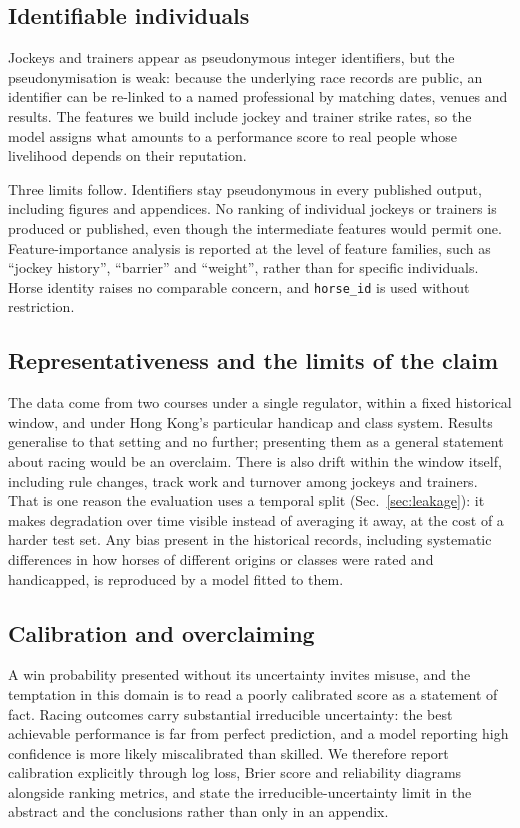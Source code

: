 \subsection{Identifiable individuals}

Jockeys and trainers appear as pseudonymous integer identifiers, but the
pseudonymisation is weak: because the underlying race records are public,
an identifier can be re-linked to a named professional by matching dates,
venues and results. The features we build include jockey and trainer strike
rates, so the model assigns what amounts to a performance score to real
people whose livelihood depends on their reputation.

Three limits follow. Identifiers stay pseudonymous in every published
output, including figures and appendices. No ranking of individual jockeys
or trainers is produced or published, even though the intermediate
features would permit one. Feature-importance analysis is reported at the
level of feature families, such as ``jockey history'', ``barrier'' and
``weight'', rather than for specific individuals. Horse identity raises no
comparable concern, and \texttt{horse\_id} is used without restriction.

\subsection{Representativeness and the limits of the claim}

The data come from two courses under a single regulator, within a fixed
historical window, and under Hong Kong's particular handicap and class
system. Results generalise to that setting and no further; presenting them
as a general statement about racing would be an overclaim. There is also
drift within the window itself, including rule changes, track work and
turnover among jockeys and trainers. That is one reason the evaluation
uses a temporal split (Sec.~\ref{sec:leakage}): it makes degradation over time
visible instead of averaging it away, at the cost of a harder test set.
Any bias present in the historical records, including systematic
differences in how horses of different origins or classes were rated and
handicapped, is reproduced by a model fitted to them.

\subsection{Calibration and overclaiming}

A win probability presented without its uncertainty invites misuse, and
the temptation in this domain is to read a poorly calibrated score as a
statement of fact. Racing outcomes carry substantial irreducible
uncertainty: the best achievable performance is far from perfect
prediction, and a model reporting high confidence is more likely
miscalibrated than skilled. We therefore report calibration explicitly
through log loss, Brier score and reliability diagrams alongside ranking
metrics, and state the irreducible-uncertainty limit in the abstract and
the conclusions rather than only in an appendix.

